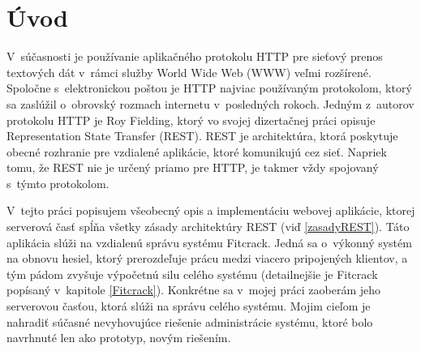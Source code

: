 \documentclass[zadani,slovak]{fitthesis}
\begin{document}
  \maketitle
  \setlength{\parskip}{0pt}

  {\hypersetup{hidelinks}\tableofcontents}
  
  \ifczech
    \renewcommand\listfigurename{Seznam obrázků}
  \fi
  \ifslovak
    \renewcommand\listfigurename{Zoznam obrázkov}
  \fi
  
  \ifczech
    \renewcommand\listtablename{Seznam tabulek}
  \fi
  \ifslovak
    \renewcommand\listtablename{Zoznam tabuliek}
  \fi

  \ifODSAZ
    \setlength{\parskip}{0.5\bigskipamount}
  \else
    \setlength{\parskip}{0pt}
  \fi

  \iftwoside
    \cleardoublepage
  \fi


\chapter{Úvod}\label{uvod}
V~súčasnosti je používanie aplikačného protokolu HTTP pre sieťový prenos textových dát v~rámci služby World Wide Web (WWW) veľmi rozšírené. Spoločne s~elektronickou poštou je HTTP najviac používaným protokolom, ktorý sa zaslúžil o~obrovský rozmach internetu v~posledných rokoch. Jedným z~autorov protokolu HTTP je Roy Fielding, ktorý vo svojej dizertačnej práci opisuje Representation State Transfer (REST). REST je architektúra, ktorá poskytuje obecné rozhranie pre vzdialené aplikácie, ktoré komunikujú cez sieť. Napriek tomu, že REST nie je určený priamo pre HTTP, je takmer vždy spojovaný s~týmto protokolom.

V~tejto práci popisujem všeobecný opis a implementáciu webovej aplikácie, ktorej serverová časť spĺňa všetky zásady architektúry REST (viď \ref{zasadyREST}). Táto aplikácia slúži na vzdialenú správu systému Fitcrack. Jedná sa o~výkonný systém na obnovu hesiel, ktorý prerozdeľuje prácu medzi viacero pripojených klientov, a tým pádom zvyšuje výpočetnú silu celého systému (detailnejšie je Fitcrack popísaný v~kapitole \ref{Fitcrack}). Konkrétne sa v~mojej práci zaoberám jeho serverovou časťou, ktorá slúži na správu celého systému. Mojim cieľom je nahradiť súčasné nevyhovujúce riešenie administrácie systému, ktoré bolo navrhnuté len ako prototyp, novým riešením.
\end{document}
